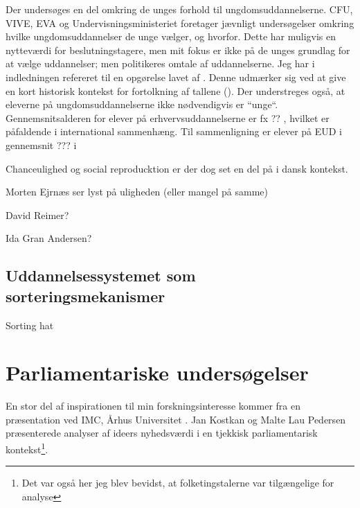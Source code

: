 Der undersøges en del omkring de unges forhold til ungdomsuddannelserne. CFU, VIVE, EVA og Undervisningsministeriet foretager jævnligt undersøgelser omkring hvilke ungdomsuddannelser de unge vælger, og hvorfor.
Dette har muligvis en nytteværdi for beslutningstagere, men mit fokus er ikke på de unges grundlag for at vælge uddannelser; men politikeres omtale af uddannelserne.
Jeg har i indledningen refereret til en opgørelse lavet af \citeauthor{danmarksstatistikErhvervsuddannelserDanmark20192019}.
Denne udmærker sig ved at give en kort historisk kontekst for fortolkning af tallene (\citeyear[s. ???]{danmarksstatistikErhvervsuddannelserDanmark20192019}).
Der understreges også, at eleverne på ungdomsuddannelserne ikke nødvendigvis er “unge“.
Gennemsnitsalderen for elever på erhvervsuddannelserne er fx ?? , hvilket er påfaldende i international sammenhæng.
Til sammenligning er elever på EUD i gennemsnit ??? i 

Chanceulighed og social reproducktion er der dog set en del på i dansk kontekst.

Morten Ejrnæs ser lyst på uligheden (eller mangel på samme)

David Reimer?

Ida Gran Andersen?

\subsection{Uddannelsessystemet som sorteringsmekanismer}

Sorting hat 

\section{Parliamentariske undersøgelser}\label{sec:review-parl}

En stor del af inspirationen til min forskningsinteresse kommer fra en præsentation ved IMC, Århus Universitet \autocite{interactingmindscentreaarhusuniversityNLPWorkshopIMC2019}. Jan Kostkan og Malte Lau Pedersen præsenterede analyser af ideers nyhedsværdi i en tjekkisk parliamentarisk kontekst\footnote{Det var også her jeg blev bevidst, at folketingstalerne var tilgængelige for analyse}.

